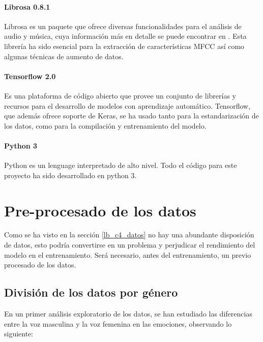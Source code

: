 \documentclass[11pt,a4paper,spanish]{book}
\begin{document}
	\paragraph{Librosa 0.8.1} Librosa es un paquete que ofrece diversas funcionalidades para el análisis de audio y música, cuya información más en detalle se puede encontrar en \cite{librosa082}. Esta librería ha sido esencial para la extracción de características MFCC así como algunas técnicas de aumento de datos.
	
	\paragraph{Tensorflow 2.0} Es una plataforma de código abierto que provee un conjunto de librerías y recursos para el desarrollo de modelos con aprendizaje automático. Tensorflow, que además ofrece soporte de Keras, se ha usado tanto para la estandarización de los datos, como para la compilación y entrenamiento del modelo.
	
	\paragraph{Python 3} Python es un lenguage interpretado de alto nivel. Todo el código para este proyecto ha sido desarrollado en python 3.
	
	\section{Pre-procesado de los datos}
	Como se ha visto en la sección \ref{lb_c4_datos} no hay una abundante disposición de datos, esto podría convertirse en un problema y perjudicar el rendimiento del modelo en el entrenamiento. 
	Será necesario, antes del entrenamiento, un previo procesado de los datos.
	
	\subsection{División de los datos por género}
	En un primer análisis exploratorio de los datos, se han estudiado las diferencias entre la voz masculina y la voz femenina en las emociones, observando lo siguiente:
	
\end{document}
